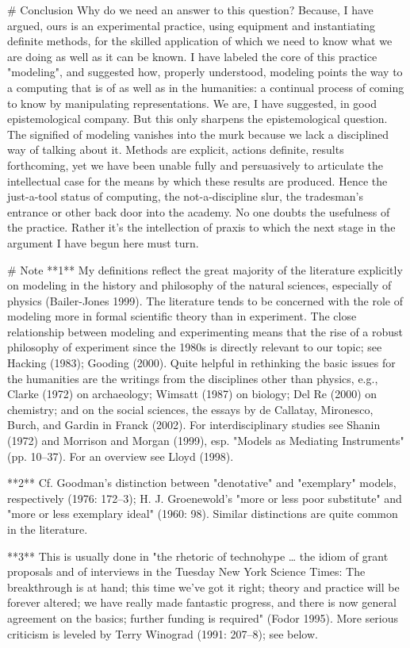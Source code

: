 # Conclusion
Why do we need an answer to this question? Because, I have argued, ours is an experimental practice, using equipment and instantiating definite methods, for the skilled application of which we need to know what we are doing as well as it can be known. I have labeled the core of this practice "modeling", and suggested how, properly understood, modeling points the way to a computing that is of as well as in the humanities: a continual process of coming to know by manipulating representations. We are, I have suggested, in good epistemological company. But this only sharpens the epistemological question. The signified of modeling vanishes into the murk because we lack a disciplined way of talking about it. Methods are explicit, actions definite, results forthcoming, yet we have been unable fully and persuasively to articulate the intellectual case for the means by which these results are produced. Hence the just-a-tool status of computing, the not-a-discipline slur, the tradesman's entrance or other back door into the academy. No one doubts the usefulness of the practice. Rather it's the intellection of praxis to which the next stage in the argument I have begun here must turn.

# Note
**1** My definitions reflect the great majority of the literature explicitly on modeling in the history and philosophy of the natural sciences, especially of physics (Bailer-Jones 1999). The literature tends to be concerned with the role of modeling more in formal scientific theory than in experiment. The close relationship between modeling and experimenting means that the rise of a robust philosophy of experiment since the 1980s is directly relevant to our topic; see Hacking (1983); Gooding (2000). Quite helpful in rethinking the basic issues for the humanities are the writings from the disciplines other than physics, e.g., Clarke (1972) on archaeology; Wimsatt (1987) on biology; Del Re (2000) on chemistry; and on the social sciences, the essays by de Callatay, Mironesco, Burch, and Gardin in Franck (2002). For interdisciplinary studies see Shanin (1972) and Morrison and Morgan (1999), esp. "Models as Mediating Instruments" (pp. 10–37). For an overview see Lloyd (1998).

**2** Cf. Goodman's distinction between "denotative" and "exemplary" models, respectively (1976: 172–3); H. J. Groenewold's "more or less poor substitute" and "more or less exemplary ideal" (1960: 98). Similar distinctions are quite common in the literature.

**3** This is usually done in "the rhetoric of technohype … the idiom of grant proposals and of interviews in the Tuesday New York Science Times: The breakthrough is at hand; this time we've got it right; theory and practice will be forever altered; we have really made fantastic progress, and there is now general agreement on the basics; further funding is required" (Fodor 1995). More serious criticism is leveled by Terry Winograd (1991: 207–8); see below.

